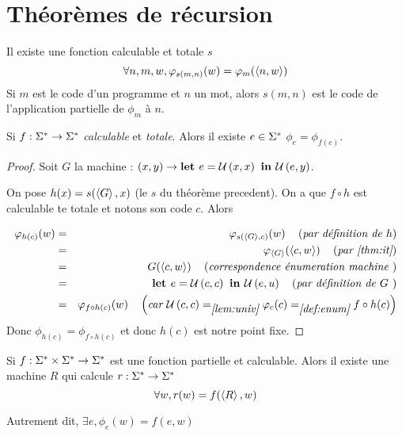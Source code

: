 \section{Théorèmes de récursion}


\begin{theorem}\label{thm:it}
	Il existe une fonction calculable et totale $s$ \tlq
	$$\forall n,m,w, \varphi_{s(m,n)}(w) = \varphi_m(\left\langle n,w\right\rangle)$$
	Si $m$ est le code d'un programme et $n$ un mot, alors $s(m,n)$ est le code de l'application partielle de $\phi_m$ à $n$.
\end{theorem}

\begin{theorem}
	Si $ f : \Sigma^{*} \to \Sigma^{*}$ \emph{calculable} et \emph {totale}. Alors il existe $e \in \Sigma^{*}$ \tq $\phi_e = \phi_{f(e)}$.
\end{theorem}


\begin{proof}
    Soit $G$ la machine : $(x,y) \to \textbf{let } e = \mathcal U \left(x,x\right) \textbf{ in } {\mathcal U \left(e,y\right)}$.

	On pose $h(x) = s(\left\langle G\right\rangle, x)$ (le $s$ du théorème precedent). On a que $f \circ h$ est calculable te totale et notons son code $c$. Alors

	\begin{eqnarray*}
		\varphi_{h(c)} (w) &=& \varphi_{s(\left\langle G\right\rangle, c)} (w) \quad\left(\textit{par définition de $h$}\right) \\
		&=& \varphi_{\left\langle G\right\rangle} (\left\langle c, w\right\rangle) \quad\left(\textit{par \ref{thm:it}}\right) \\
		&=& G (\left\langle c, w\right\rangle) \quad\left(\textit{correspondence énumeration machine }\right)\\
		&=& \textbf{let } e = \mathcal U \left(c,c\right) \textbf{ in } \mathcal U \left(e,u\right) \quad\left(\textit{par définition de $G$ }\right)\\
		&=& \varphi_{f \circ h (c)}(w) \quad\left(\textit{car $\mathcal U \left(c,c\right) =_{\ref{lem:univ}} \varphi_c(c) =_{\ref{def:enum}} f \circ h (c)$}\right)
	\end{eqnarray*}
	Donc $\phi_{h(c)} = \phi_{f \circ h (c)}$ et donc $h(c)$ est notre point fixe.
\end{proof}


\begin{theorem}[de récursion]
	Si $f : \Sigma^{*} \times \Sigma^{*} \to \Sigma^{*}$ est une fonction partielle et calculable. Alors il existe une machine $R$ qui calcule $r : \Sigma^{*} \to \Sigma^{*} $ \tq
	$$ \forall w, r(w) =  f (\left\langle R\right\rangle, w)$$

	Autrement dit, $\exists e, \phi_e (w) = f (e, w)$
\end{theorem}


